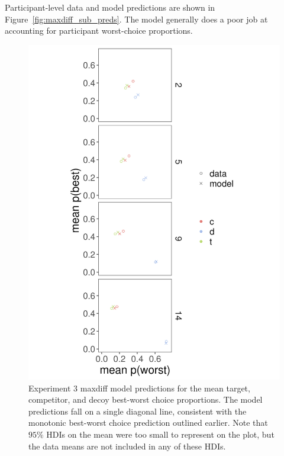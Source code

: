 Participant-level data and model predictions are shown in Figure~\ref{fig:maxdiff_sub_preds}. The model generally does a poor job at accounting for participant worst-choice proportions.

\begin{figure}
   \includegraphics[width=\linewidth]{figures/maxdiff_1_means_model_v_data.jpeg}
   \caption{Experiment 3 maxdiff model predictions for the mean target, competitor, and decoy best-worst choice proportions. The model predictions fall on a single diagonal line, consistent with the monotonic best-worst choice prediction outlined earlier. Note that $95\%$ HDIs on the mean were too small to represent on the plot, but the data means are not included in any of these HDIs.}
   \label{fig:maxdiff_collapsed_preds}
\end{figure}

